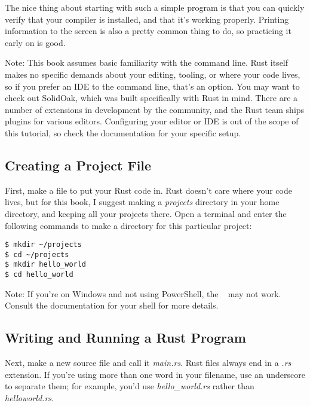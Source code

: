 \blank

The nice thing about starting with such a simple program is that you can quickly verify that your compiler is installed, 
and that it's working properly. Printing information to the screen is also a pretty common thing to do, so practicing it 
early on is good.

\begin{myquote}
    Note: This book assumes basic familiarity with the command line. Rust itself makes no specific demands about your editing,
    tooling, or where your code lives, so if you prefer an IDE to the command line, that's an option. You may want to check out
    SolidOak, which was built specifically with Rust in mind. There are a number of extensions in development by the community, 
    and the Rust team ships plugins for various editors. Configuring your editor or IDE is out of the scope of this tutorial, so
    check the documentation for your specific setup.
\end{myquote}

\subsection*{Creating a Project File}

First, make a file to put your Rust code in. Rust doesn't care where your code lives, but for this book, I suggest making a 
\emph{projects} directory in your home directory, and keeping all your projects there. Open a terminal and enter the following 
commands to make a directory for this particular project:

\begin{verbatim}
$ mkdir ~/projects
$ cd ~/projects
$ mkdir hello_world
$ cd hello_world
\end{verbatim}

\begin{myquote}
Note: If you're on Windows and not using PowerShell, the ~ may not work. Consult the documentation for your shell for more details.
\end{myquote}

\subsection*{Writing and Running a Rust Program}

Next, make a new source file and call it \emph{main.rs}. Rust files always end in a \emph{.rs} extension. If you're using more 
than one word in your filename, use an underscore to separate them; for example, you'd use \emph{hello\_world.rs} rather than 
\emph{helloworld.rs}.

